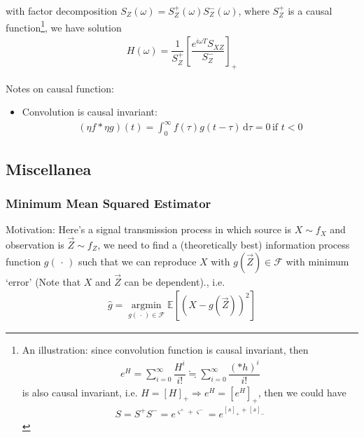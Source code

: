 with factor decomposition $ S_Z(\omega )=S_Z^+(\omega )S_Z^-(\omega ) $, where $ S_Z^+ $ is a causal function\footnote{An illustration: since convolution function is causal invariant, then
\begin{align*}
    e^H=\sum_{i=0}^\infty \dfrac{H^i}{i!}\fallingdotseq \sum_{i=0}^\infty \dfrac{(* h)^i}{i!} 
\end{align*}
is also causal invariant, i.e. $ H=[H]_+\Rightarrow e^H=[e^H]_+ $, then we could have
\begin{align*}
    S=S^+S^-=e^{\varsigma^++\varsigma^-}=e^{[s]_++[s]_-}
\end{align*}
}, we have solution
\begin{align*}
    H(\omega )=\dfrac{1}{S_Z^+}\left[\dfrac{e^{i\omega T}S_{XZ}}{S_Z^-}\right]_+ 
\end{align*}


Notes on causal function:
\begin{itemize}[topsep=2pt,itemsep=0pt]
    \item Convolution is causal invariant:
    \begin{align*}
        (\eta f * \eta g)(t) = \int_0^\infty f(\tau)g(t-\tau) \,\mathrm{d}\tau = 0 \,\text{if }t<0
    \end{align*}
\end{itemize}

    










\subsection{Miscellanea}

\subsubsection{Minimum Mean Squared Estimator}\label{SubSecMMSE}
    Motivation: Here's a signal transmission process in which source is $ X\sim f_{X} $ and observation is $ \vec{Z}\sim f_Z $, we need to find a (theoretically best) information process function $ g(\, \cdot \, ) $ such that we can reproduce $ X $ with $ g(\vec{Z})\in\mathscr{F} $ with minimum `error' (Note that $ X$ and $\vec{Z} $ can be dependent)., i.e.
    \begin{align}
        \hat{g}=\mathop{\arg\min}\limits_{g(\, \cdot \, )\in \mathscr{F}} \mathbb{E}\left[ (X-g(\vec{Z}))^2 \right] 
    \end{align}

